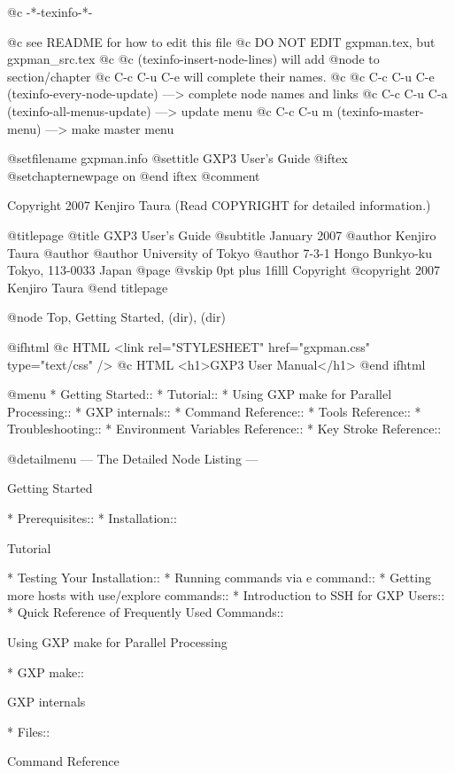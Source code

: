   @c -*-texinfo-*-

@c see README for how to edit this file
@c DO NOT EDIT gxpman.tex, but gxpman_src.tex
@c
@c (texinfo-insert-node-lines) will add @node to section/chapter
@c C-c C-u C-e will complete their names.
@c 
@c C-c C-u C-e  (texinfo-every-node-update) ---> complete node names and links
@c C-c C-u C-a  (texinfo-all-menus-update)  ---> update menu
@c C-c C-u m    (texinfo-master-menu)       ---> make master menu

@setfilename gxpman.info
@settitle GXP3 User's Guide
@iftex
@setchapternewpage on
@end iftex
@comment %


Copyright 2007 Kenjiro Taura (Read COPYRIGHT for detailed information.)


@titlepage
@title GXP3 User's Guide
@subtitle January 2007
@author Kenjiro Taura
@author
@author University of Tokyo
@author 7-3-1 Hongo Bunkyo-ku Tokyo, 113-0033 Japan
@page
@vskip 0pt plus 1filll
Copyright @copyright{} 2007 Kenjiro Taura
@end titlepage

@node Top, Getting Started, (dir), (dir)

@ifhtml
@c HTML <link rel="STYLESHEET" href="gxpman.css" type="text/css" />
@c HTML <h1>GXP3 User Manual</h1>
@end ifhtml

@menu
* Getting Started::             
* Tutorial::                    
* Using GXP make for Parallel Processing::  
* GXP internals::               
* Command Reference::           
* Tools Reference::             
* Troubleshooting::             
* Environment Variables Reference::  
* Key Stroke Reference::        

@detailmenu
 --- The Detailed Node Listing ---

Getting Started

* Prerequisites::               
* Installation::                

Tutorial

* Testing Your Installation::   
* Running commands via e command::  
* Getting more hosts with use/explore commands::  
* Introduction to SSH for GXP Users::  
* Quick Reference of Frequently Used Commands::  

Using GXP make for Parallel Processing

* GXP make::                    

GXP internals

* Files::                       

Command Reference

